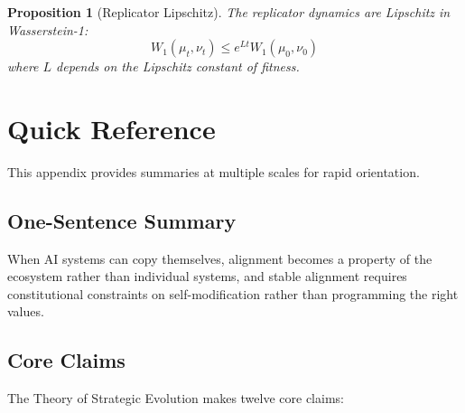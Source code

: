 \documentclass[12pt]{article}
\newtheorem{proposition}[theorem]{Proposition}
\begin{document}
\begin{proposition}[Replicator Lipschitz]
The replicator dynamics are Lipschitz in Wasserstein-1:
\[
W_1(\mu_t, \nu_t) \leq e^{Lt} W_1(\mu_0, \nu_0)
\]
where $L$ depends on the Lipschitz constant of fitness.
\end{proposition}


\section{Quick Reference}
\label{app:quickref}

This appendix provides summaries at multiple scales for rapid orientation.

\subsection{One-Sentence Summary}

When AI systems can copy themselves, alignment becomes a property of the ecosystem rather than individual systems, and stable alignment requires constitutional constraints on self-modification rather than programming the right values.

\subsection{Core Claims}

The Theory of Strategic Evolution makes twelve core claims:
\end{document}
